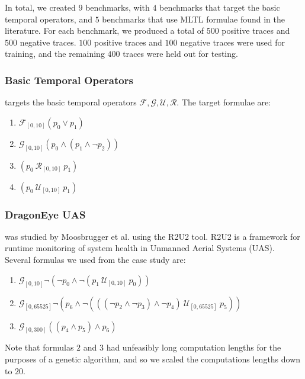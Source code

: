 \documentclass[runningheads]{llncs}
\begin{document}
In total, we created $9$ benchmarks, with $4$ benchmarks that target the basic temporal operators, and $5$ benchmarks that use MLTL formulae found in the literature. For each benchmark, we produced a total of $500$ positive traces and $500$ negative traces. $100$ positive traces and $100$ negative traces were used for training, and the remaining $400$ traces were held out for testing.

\subsubsection{Basic Temporal Operators} targets the basic temporal operators $\mathcal{F}, \mathcal{G}, \mathcal{U}, \mathcal{R}$. The target formulae are:
\begin{enumerate}
    \item $\mathcal{F}_{[0, 10]} (p_0 \lor p_1)$
    \item $\mathcal{G}_{[0, 10]} (p_0 \land (p_1 \land \neg p_2))$
    \item $(p_0 \ \mathcal{R}_{[0, 10]} \ p_1)$
    \item $(p_0 \ \mathcal{U}_{[0, 10]} \ p_1)$
\end{enumerate}

\subsubsection{DragonEye UAS} was studied by Moosbrugger et al. \cite{Moosbrugger_Rozier_Schumann_2017} using the R2U2 tool. 
R2U2 is a framework for runtime monitoring of system health in Unmanned Aerial Systems (UAS). Several formulas we used from the case study are: 
\begin{enumerate}
    \item $\mathcal{G}_{[0, 10]} \neg (\neg p_0 \land \neg (p_1 \ \mathcal{U}_{[0, 10]} \ p_0))$
    \item $\mathcal{G}_{[0, 65525]} \neg (p_6 \land \neg (((\neg p_2 \land \neg p_3) \land \neg p_4) \ \mathcal{U}_{[0, 65525]} \ p_5))$
    \item $\mathcal{G}_{[0, 300]} ((p_4 \land p_5) \land p_6)$
\end{enumerate} 
Note that formulas $2$ and $3$ had unfeasibly long computation lengths for the purposes of a genetic algorithm, and so we scaled the computations lengths down to $20$. 
\end{document}
